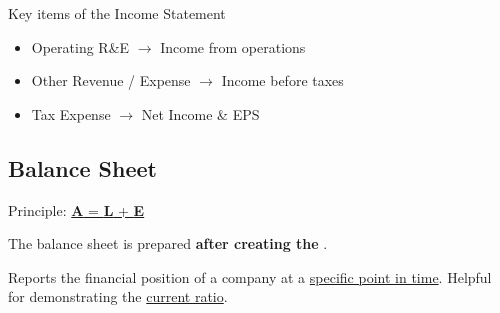 \begin{knBox}
    {Key items of the Income Statement}
    \begin{itemize}
        \item Operating R\&E $\rightarrow$ Income from operations
        \item Other Revenue / Expense $\rightarrow$ Income before taxes
        \item Tax Expense $\rightarrow$ Net Income \& EPS
    \end{itemize}
\end{knBox}

\subsection{Balance Sheet}
\label{sec:balance_sheet}

Principle: \hyperref[thm:relations]{\textbf{A} = \textbf{L} + \textbf{E}}

The balance sheet is prepared \textbf{after creating the }.

Reports the financial position of a company at a \underline{specific point in time}. Helpful for demonstrating the \hyperref[def:current_ratio]{current ratio}.

